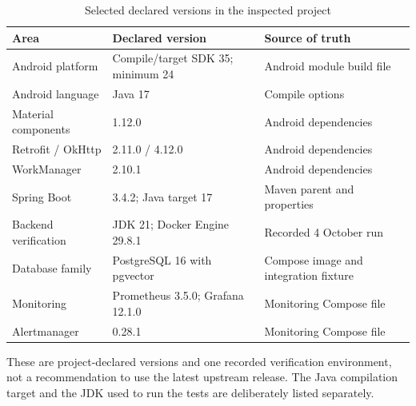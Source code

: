 \documentclass[12pt,a4paper,oneside]{report}
\begin{document}
\begin{table}[H]\centering
\caption{Selected declared versions in the inspected project}\label{tab:versions}
\begin{tabular}{P{0.28\textwidth}P{0.27\textwidth}P{0.34\textwidth}}\toprule
\textbf{Area} & \textbf{Declared version} & \textbf{Source of truth}\\\midrule
Android platform & Compile/target SDK 35; minimum 24 & Android module build file\\
Android language & Java 17 & Compile options\\
Material components & 1.12.0 & Android dependencies\\
Retrofit / OkHttp & 2.11.0 / 4.12.0 & Android dependencies\\
WorkManager & 2.10.1 & Android dependencies\\
Spring Boot & 3.4.2; Java target 17 & Maven parent and properties\\
Backend verification & JDK 21; Docker Engine 29.8.1 & Recorded 4 October run\\
Database family & PostgreSQL 16 with pgvector & Compose image and integration fixture\\
Monitoring & Prometheus 3.5.0; Grafana 12.1.0 & Monitoring Compose file\\
Alertmanager & 0.28.1 & Monitoring Compose file\\
\bottomrule
\end{tabular}
\end{table}

These are project-declared versions and one recorded verification environment, not
a recommendation to use the latest upstream release. The Java compilation target
and the JDK used to run the tests are deliberately listed separately.
\end{document}
